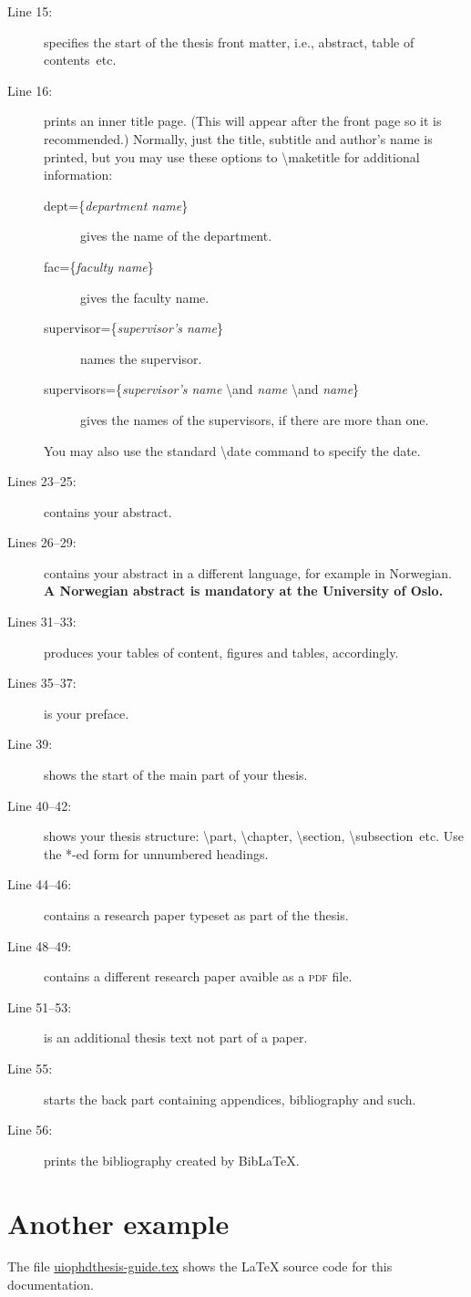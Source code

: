 \documentclass[UKenglish]{uiophdthesis}
\newcommand{\bsl}{\textbackslash}
\newcommand{\p}[1]{\textsf{#1}}
\newcommand{\pcmd}[1]{\p{\bsl #1}}
\newcommand{\ppar}[1]{\p{\{#1\}}}
\begin{document}
\begin{description}
\item[Line 15:] specifies the start of the thesis front matter, i.e.,
  abstract, table of contents~etc.
\item[Line 16:] prints an inner title page. (This will appear after
  the front page so it is recommended.) Normally, just the title, subtitle and
  author's name is printed, but you may use these options to
  \pcmd{maketitle} for additional information:
  \begin{description}
  \item[\p{dept=\ppar{\emph{department name}}}] gives the name of the
    department. 
  \item[\p{fac=\ppar{\emph{faculty name}}}] gives the faculty name. 
  \item[\p{supervisor=\ppar{\emph{supervisor's name}}}] names the
    supervisor. 
  \item[\p{supervisors=\ppar{\emph{supervisor's name} \pcmd{and} \emph{name}
          \pcmd{and} \emph{name}}}] gives the names of the
    supervisors, if there are more than one. 
  \end{description}
  You may also use the standard \pcmd{date} command to specify the date.
\item[Lines 23--25:] contains your abstract.
\item[Lines 26--29:] contains your abstract in a different language,
  for example in Norwegian. \textbf{A Norwegian abstract is mandatory
    at the University of Oslo.} 
\item[Lines 31--33:] produces your tables of content, figures and
  tables, accordingly.
\item[Lines 35--37:] is your preface.

\item[Line 39:] shows the start of the main part of your thesis.
\item[Line 40--42:] shows your thesis structure: \pcmd{part},
  \pcmd{chapter}, \pcmd{section}, \pcmd{subsection}~etc.
  Use the *-ed form for unnumbered headings.
\item[Line 44--46:] contains a research paper typeset as part of the thesis.
\item[Line 48--49:] contains a different research paper avaible as a
  \textsc{pdf} file. 
\item[Line 51--53:] is an additional thesis text not part of a paper.
\item[Line 55:] starts the back part containing appendices,
  bibliography and such.
\item[Line 56:] prints the bibliography created by Bib\LaTeX.
\end{description}

\section{Another example}
The file \url{uiophdthesis-guide.tex} shows the \LaTeX{} source
code for this documentation.
\end{document}
